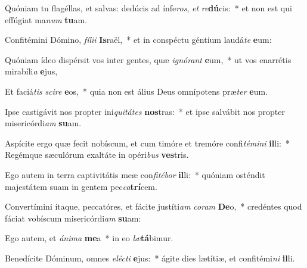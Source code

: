 \item Quóniam tu flagéllas, et salvas: dedúcis ad ínfe\textit{ros}, \textit{et} \textit{re}\textbf{dú}cis:~* et non est qui effúgiat ma\textit{num} \textbf{tu}am.
\item Confitémini Dómino, \textit{fí}\textit{li}\textit{i} \textbf{Is}raël,~* et in conspéctu géntium laudá\textit{te} \textbf{e}um:
\item Quóniam ídeo dispérsit vos inter gentes, quæ \textit{i}\textit{gnó}\textit{rant} \textbf{e}um,~* ut vos enarrétis mirabíli\textit{a} \textbf{e}jus,
\item Et faciá\textit{tis} \textit{sci}\textit{re} \textbf{e}os,~* quia non est álius Deus omnípotens præ\textit{ter} \textbf{e}um.
\item Ipse castigávit nos propter ini\textit{qui}\textit{tá}\textit{tes} \textbf{nos}tras:~* et ipse salvábit nos propter misericórdi\textit{am} \textbf{su}am.
\item Aspícite ergo quæ fecit nobíscum, et cum timóre et tremóre confi\textit{té}\textit{mi}\textit{ni} \textbf{il}li:~* Regémque sæculórum exaltáte in opéri\textit{bus} \textbf{ves}tris.
\item Ego autem in terra captivitátis meæ con\textit{fi}\textit{té}\textit{bor} \textbf{il}li:~* quóniam osténdit majestátem suam in gentem pec\textit{ca}\textbf{trí}cem.
\item Convertímini ítaque, peccatóres, et fácite justíti\textit{am} \textit{co}\textit{ram} \textbf{De}o,~* credéntes quod fáciat vobíscum misericórdi\textit{am} \textbf{su}am:
\item Ego autem, et \textit{á}\textit{ni}\textit{ma} \textbf{me}a~* in eo \textit{læ}\textbf{tá}bimur.
\item Benedícite Dóminum, omnes \textit{e}\textit{léc}\textit{ti} \textbf{e}jus:~* ágite dies lætítiæ, et confitémi\textit{ni} \textbf{il}li.
